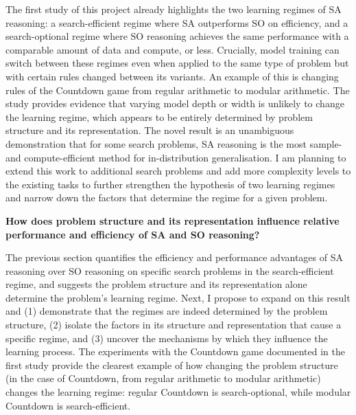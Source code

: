 The first study of this project already highlights the two learning regimes of SA reasoning: a search-efficient regime where SA outperforms SO on efficiency, and a search-optional regime where SO reasoning achieves the same performance with a comparable amount of data and compute, or less. Crucially, model training can switch between these regimes even when applied to the same type of problem but with certain rules changed between its variants.
An example of this is changing rules of the Countdown game from regular arithmetic to modular arithmetic.
The study provides evidence that varying model depth or width is unlikely to change the learning regime, which appears to be entirely determined by problem structure and its representation.
The novel result is an unambiguous demonstration that for some search problems, SA reasoning is the most sample- and compute-efficient method for in-distribution generalisation.
I am planning to extend this work to additional search problems and add more complexity levels to the existing tasks to further strengthen the hypothesis of two learning regimes and narrow down the factors that determine the regime for a given problem.

\bigskip

\textbf{How does problem structure and its representation influence relative performance and efficiency of SA and SO reasoning?}

\bigskip

The previous section quantifies the efficiency and performance advantages of SA reasoning over SO reasoning on specific search problems in the search-efficient regime, and suggests the problem structure and its representation alone determine the problem's learning regime.
Next, I propose to expand on this result and (1) demonstrate that the regimes are indeed determined by the problem structure, (2) isolate the factors in its structure and representation that cause a specific regime, and (3) uncover the mechanisms by which they influence the learning process.
The experiments with the Countdown game documented in the first study provide the clearest example of how changing the problem structure (in the case of Countdown, from regular arithmetic to modular arithmetic) changes the learning regime: regular Countdown is search-optional, while modular Countdown is search-efficient.

